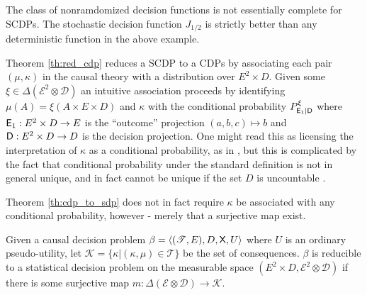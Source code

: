 \begin{corollary}
The class of nonramdomized decision functions is not essentially complete for SCDPs. The stochastic decision function $J_{1/2}$ is strictly better than any deterministic function in the above example.
\end{corollary}

Theorem \ref{th:red_cdp} reduces a SCDP to a CDPs by associating each pair $(\mu,\kappa)$ in the causal theory with a distribution over $E^2\times D$. Given some $\xi\in \Delta(\mathcal{E}^2\otimes \mathcal{D})$ an intuitive association proceeds by identifying $\mu(A)=\xi(A\times E\times D)$ and $\kappa$ with the conditional probability $P^\xi_{\mathsf{E}_1|\mathsf{D}}$ where $\mathsf{E}_1:E^2\times D\to E$ is the ``outcome'' projection $(a,b,c)\mapsto b$ and $\mathsf{D}:E^2\times D\to D$ is the decision projection. One might read this as licensing the interpretation of $\kappa$ as a conditional probability, as in \cite{dawid_beware_2010}, but this is complicated by the fact that conditional probability under the standard definition is not in general unique, and in fact cannot be unique if the set $D$ is uncountable \cite{hajek_what_2003}. 

Theorem \ref{th:cdp_to_sdp} does not in fact require $\kappa$ be associated with any conditional probability, however - merely that a surjective map exist.

\begin{theorem}\label{th:red_cdp}
Given a causal decision problem $\beta=\langle (\mathscr{T},E),D,\mathsf{X},U\rangle$ where $U$ is an ordinary pseudo-utility, let $\mathscr{K}=\{\kappa|(\kappa,\mu)\in \mathscr{T}\}$ be the set of consequences. $\beta$ is reducible to a statistical decision problem on the measurable space $(E^2\times D,\mathcal{E}^2\otimes \mathcal{D})$ if there is some surjective map $m:\Delta(\mathcal{E}\otimes\mathcal{D})\to \mathscr{K}$.
\end{theorem}

